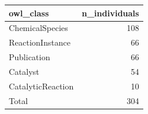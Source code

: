 \begin{tabular}{lr}
\toprule
owl\_class & n\_individuals \\
\midrule
ChemicalSpecies & 108 \\
ReactionInstance & 66 \\
Publication & 66 \\
Catalyst & 54 \\
CatalyticReaction & 10 \\
Total & 304 \\
\bottomrule
\end{tabular}
